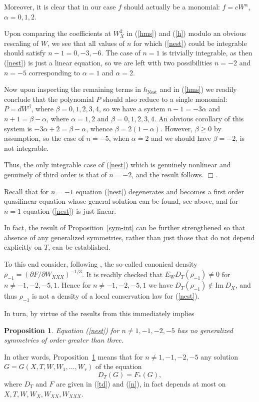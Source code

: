 \documentclass[12pt]{article}
\newtheorem{pro}{Proposition}
\begin{document}
Moreover, it is clear that in our case $f$ should actually be a monomial: $f=cW^\alpha$, $\alpha=0,1,2$.


Upon comparing the coefficients at $W_X^2$ in (\ref{hms}) and (\ref{h}) modulo an obvious rescaling of $W$, we see that all values of $n$ for which (\ref{nest}) could be integrable should satisfy $n-1=0,-3,-6$. The case of $n=1$ is trivially integrable, as then (\ref{nest}) is just a linear equation,
so we are left with two possibilities $n=-2$ and $n=-5$ corresponding to $\alpha=1$ and $\alpha=2$.

Now upon inspecting the remaining terms in $h_{\mathrm{Nest}}$ and in (\ref{hms}) we readily conclude that the polynomial $P$ should also reduce to a single monomial: $P=d W^\beta$, where $\beta=0,1,2,3,4$, so we have a system $n-1=-3\alpha$ and $n+1=\beta-\alpha$, where $\alpha=1,2$ and $\beta=0,1,2,3,4$. An obvious corollary of this system is $-3\alpha+2=\beta-\alpha$, whence $\beta=2(1-\alpha)$.
However, $\beta\geq 0$ by assumption, so the case of $n=-5$, when $\alpha=2$ and we should have $\beta=-2$, is not integrable.

Thus, the only integrable case of (\ref{nest}) which is genuinely nonlinear and genuinely of third order is that of $n=-2$, and the result follows. $\Box$.

Recall that for $n=-1$ equation (\ref{nest}) degenerates and becomes a first order quasilinear equation whose general solution can be found, see above, and for $n=1$ equation (\ref{nest}) is just linear.


In fact, the %
result of Proposition~\ref{sym-int} can be further strengthened so that absence of any generalized symmetries, rather than just those that do not depend explicitly on $T$, can be established.

To this end consider, following \cite{mikshab}, the so-called canonical density $\rho_{-1}=(\partial F/\partial W_{XXX})^{-1/3}$.
%
It is readily checked that $E_W D_T(\rho_{-1})\neq 0$ for $n\neq -1,-2,-5,1$.
Hence for $n\neq -1,-2,-5,1$ we have $D_T(\rho_{-1})\not\in\mathrm{Im}\ D_X$, and thus $\rho_{-1}$ is not a density of
a local conservation law for (\ref{nest}).

In turn, by virtue of the results from \cite{as} this immediately implies %
\begin{pro}\label{sym-pro}
Equation (\ref{nest})
for $n\neq 1,-1,-2,-5$ has no generalized symmetries of order greater than three.
\end{pro}
In other words, Proposition~\ref{sym-pro} means that
for $n\neq 1,-1,-2,-5$ any solution $G=G(X,T,W,W_1,\dots,W_r)$
of %
the equation
\begin{equation}\label{sym}
D_T (G)=F_*(G),
\end{equation}
where $D_T$ and $F$ are given in (\ref{td}) and (\ref{n}),
in fact depends at most on $X,T,W,W_X,W_{XX},W_{XXX}$.
\end{document}
